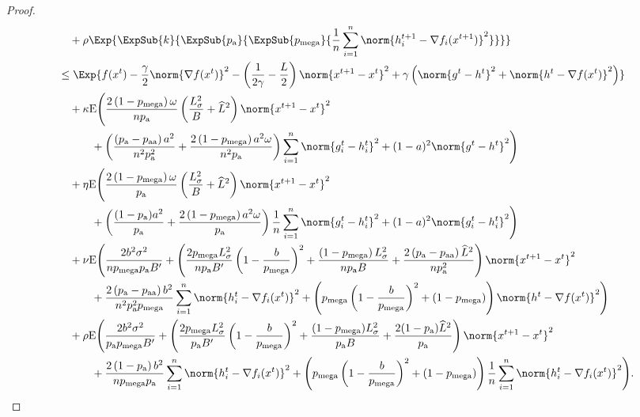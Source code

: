 \documentclass{article}
\newcommand*{\probavailable}{\ensuremath{p_{\textnormal{a}}}}
\newcommand*{\probpairaa}{\ensuremath{p_{\textnormal{aa}}}}
\newcommand*{\probmega}{\ensuremath{p_{\text{mega}}}}
\begin{document}
\begin{proof}
\begin{align*}
    &\quad + \rho \Exp{\ExpSub{k}{\ExpSub{\probavailable}{\ExpSub{\probmega}{\frac{1}{n}\sum_{i=1}^n\norm{h^{t+1}_i - \nabla f_i(x^{t+1})}^2}}}} \\
    &\leq \Exp{f(x^t) - \frac{\gamma}{2}\norm{\nabla f(x^t)}^2 - \left(\frac{1}{2\gamma} - \frac{L}{2}\right)
    \norm{x^{t+1} - x^t}^2 + \gamma\left(\norm{g^{t} - h^t}^2 + \norm{h^t - \nabla f(x^t)}^2\right)}\nonumber\\
    &\quad  + \kappa {\rm E}\Bigg(\frac{2 \left(1 - \probmega\right) \omega}{n \probavailable}\left(\frac{L_{\sigma}^2}{B} + \widehat{L}^2\right) \norm{x^{t+1} - x^{t}}^2 \\
    &\qquad\quad + \left(\frac{\left(\probavailable - \probpairaa\right)a^2}{n^2 \probavailable^2} + \frac{2 \left(1 - \probmega\right) a^2 \omega}{n^2 \probavailable}\right)\sum_{i=1}^n\norm{g^{t}_i - h^{t}_i}^2 + (1 - a)^2\norm{g^{t} - h^{t}}^2\Bigg) \\
      &\quad  + \eta {\rm E}\Bigg(\frac{2\left(1 - \probmega\right) \omega}{\probavailable} \left(\frac{L_{\sigma}^2}{B} + \widehat{L}^2\right) \norm{x^{t+1} - x^{t}}^2 \\
      &\qquad\quad+ \left(\frac{(1 - \probavailable) a^2}{\probavailable} + \frac{2 \left(1 - \probmega\right) a^2 \omega}{\probavailable}\right)\frac{1}{n}\sum_{i=1}^n\norm{g^{t}_{i} - h^{t}_{i}}^2 + (1 - a)^2 \norm{g^{t}_{i} - h^{t}_{i}}^2\Bigg) \\
      &\quad  + \nu {\rm E}\Bigg(\frac{2 b^2 \sigma^2}{n \probmega \probavailable B'} + \left(\frac{2 \probmega L_{\sigma}^2}{n \probavailable B'}\left(1 - \frac{b}{\probmega}\right)^2 + \frac{\left(1 - \probmega\right)L_{\sigma}^2}{n \probavailable B} + \frac{2\left(\probavailable - \probpairaa\right) \widehat{L}^2}{n \probavailable^2}\right)\norm{x^{t+1} - x^{t}}^2\\
      &\qquad\quad + \frac{2\left(\probavailable - \probpairaa\right) b^2}{n^2 \probavailable^2 \probmega}\sum_{i=1}^n\norm{h^t_i -  \nabla f_i(x^{t})}^2 + \left(\probmega \left(1 - \frac{b}{\probmega}\right)^2 + (1 - \probmega)\right) \norm{h^{t} - \nabla f(x^{t})}^2\Bigg) \\
      &\quad  + \rho {\rm E}\Bigg(\frac{2 b^2 \sigma^2}{\probavailable \probmega B'} + \left(\frac{2 \probmega L_{\sigma}^2}{\probavailable B'}\left(1 - \frac{b}{\probmega}\right)^2 + \frac{(1 - \probmega) L_{\sigma}^2}{\probavailable B} + \frac{2(1 - \probavailable) \widehat{L}^2}{\probavailable}\right) \norm{x^{t+1} - x^{t}}^2\\
      &\qquad\quad + \frac{2\left(1 - \probavailable\right)b^2}{n \probmega \probavailable} \sum_{i=1}^n\norm{h^t_i - \nabla f_i(x^{t})}^2 + \left(\probmega \left(1 - \frac{b}{\probmega}\right)^2 + (1 - \probmega)\right) \frac{1}{n} \sum_{i=1}^n \norm{h^{t}_i - \nabla f_i(x^{t})}^2\Bigg).
  \end{align*}


\end{proof}
\end{document}
